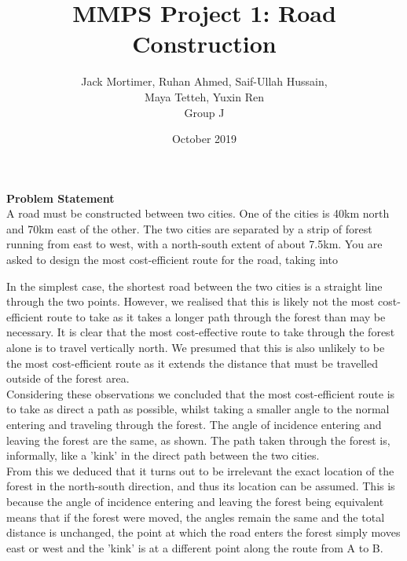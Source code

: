 \documentclass[12pt,a4paper]{article}
\title{MMPS Project 1: Road Construction}
\author{Jack Mortimer, Ruhan Ahmed, Saif-Ullah Hussain,\\ Maya Tetteh, Yuxin Ren\\ Group J}
\date{October 2019}
\begin{document}
\begin{titlepage}
\maketitle
\thispagestyle{empty}
\end{titlepage}

\clearpage
{}
\textbf{Problem Statement}\\
A road must be constructed between two cities. One of the cities is 40km north and 70km east of the other. The two cities are separated by a strip of forest running from east to west, with a north-south extent of about 7.5km. You are asked to design the most cost-efficient route for the road, taking into 



In the simplest case, the shortest road between the two cities is a straight line through the two points. However, we realised that this is likely not the most cost-efficient route to take as it takes a longer path through the forest than may be necessary. It is clear that the most cost-effective route to take through the forest alone is to travel vertically north. We presumed that this is also unlikely to be the most cost-efficient route as it extends the distance that must be travelled outside of the forest area.\\
\clearpage
\indent Considering these observations we concluded that the most cost-efficient route is to take as direct a path as possible, whilst taking a smaller angle to the normal entering and traveling through the forest. The angle of incidence entering and leaving the forest are the same, as shown. The path taken through the forest is, informally, like a 'kink' in the direct path between the two cities.\\
\indent From this we deduced that it turns out to be irrelevant the exact location of the forest in the north-south direction, and thus its location can be assumed. This is because the angle of incidence entering and leaving the forest being equivalent means that if the forest were moved, the angles remain the same and the total distance is unchanged, the point at which the road enters the forest simply moves east or west and the 'kink' is at a different point along the route from A to B.\\
\end{document}
